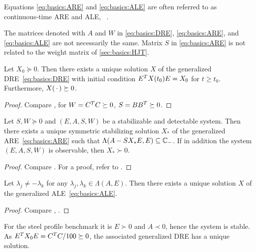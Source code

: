 \begin{remark}
  Equations \eqref{eq:basics:ARE} and \eqref{eq:basics:ALE} are often referred to as
  continuous-time \ac{ARE} and \ac{ALE}, \cf~\cite[Remark~2.11]{Lang2017}.
\end{remark}

\begin{remark}
  The matrices denoted with $A$ and $W$ in \eqref{eq:basics:DRE}, \eqref{eq:basics:ARE}, and \eqref{eq:basics:ALE} are not necessarily the same.
  Matrix $S$ in \eqref{eq:basics:ARE} is not related to the weight matrix of \autoref{sec:basics:HJT}.
\end{remark}

\begin{theorem}
  Let $X_0 \succeq 0$.
  Then there exists a unique solution $X$ of the generalized \ac{DRE}~\eqref{eq:basics:DRE}
  with initial condition $E^T X(t_0) E = X_0$ for $t \geq t_0$.
  Furthermore, $X(\optional{}) \succeq 0$.
\end{theorem}
\begin{proof}
  Compare \cite[Theorem~2.7]{Lang2017}, \cite[Theorem~4.1.6]{Abou2003}
  for $W = C^T C \succeq 0$, $S=BB^T \succeq 0$.
\end{proof}

\begin{theorem}
  Let $S, W \succeq 0$ and $(E, A, S, W)$ be a stabilizable and detectable system.
  Then there exists a unique symmetric stabilizing solution $X_*$ of the generalized \ac{ARE}~\eqref{eq:basics:ARE}
  such that $\Lambda(A - SX_*E, E) \subseteq \mathbb{C}_-$.
  If in addition the system $(E, A, S, W)$ is observable, then $X_* \succ 0$.
\end{theorem}
\begin{proof}
  Compare \cite[Theorem~2.9]{Lang2017}.
  For a proof, refer to \cite{Lancaster1995}.
\end{proof}

\begin{theorem}
  Let $\lambda_j \neq -\lambda_k$ for any $\lambda_j, \lambda_k \in\Lambda(A, E)$.
  Then there exists a unique solution $X$ of the generalized \ac{ALE}~\eqref{eq:basics:ALE}.
\end{theorem}
\begin{proof}
  Compare \cite[Theorem~2.10]{Lang2017}, \cite[Corollary~1.1.4]{Abou2003}.
\end{proof}

\begin{example}
  For the steel profile benchmark \cite{morwiki_steel} it is
  $E \succ 0$ and $A \prec 0$, hence the system is stable.
  As $E^T X_0 E = C^T C / 100 \succeq 0$,
  the associated generalized \ac{DRE} has a unique solution.
\end{example}
